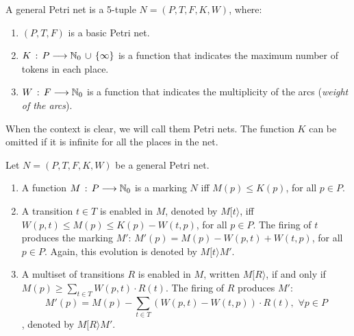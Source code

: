 \begin{definition} 
A general Petri net is a 5-tuple $N=(P,T,F,K,W)$, where:
\begin{enumerate}
\item $(P,T,F)$ is a basic Petri net.
\item $K\,:\,P \longrightarrow \mathbb{N}_{0} \,\cup\, \{\infty\}$ is a function that
indicates the maximum number of tokens in each place.
\item $W\,:\,F \longrightarrow \mathbb{N}_{0}$ is a function that indicates
the multiplicity of the arcs ({\it weight of the arcs}).
\end{enumerate}
When the context is clear, we will call them Petri nets. The function $K$
can be omitted if it is infinite for all the places in the net.
\end{definition}

\begin{definition} 
Let $N=(P,T,F,K,W)$ be a general Petri net.
\begin{enumerate}
\item A function $M\,:\, P \longrightarrow \mathbb{N}_{0}$ is a marking
$N$ iff $M(p) \leq K(p)$, for all
$p \in P$.
\item A transition $t \in T$ is enabled in $M$, denoted by $M[ t \rangle$,
iff $W(p,t) \leq M(p) \leq K(p) - W(t,p)$, for all $p \in P$.
The firing of $t$ produces the marking $M'$:
$M'(p) = M(p) - W(p,t) + W(t,p)$, for all $p \in P$.
Again, this evolution is denoted by $M[ t \rangle M'$.
\item A multiset of transitions $R$ is enabled in $M$, written $M [ R \rangle$, if and only if
$M(p) \geq \sum_{t \in T} W(p,t) \cdot R(t)$. The firing of $R$
produces $M'$:
\[ M'(p) = M(p) - \sum_{t \in T} (W(p,t) - W(t,p)) \cdot R(t), \,\,
\forall p \in P\], denoted by $M [ R \rangle M'$.
\end{enumerate}
\end{definition}


